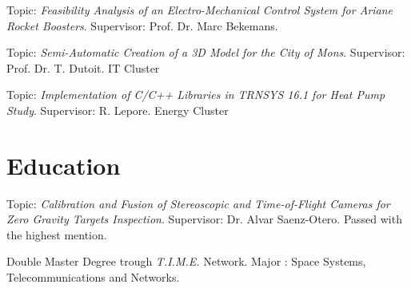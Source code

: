 \documentclass[a4paper]{deedy-resume} %
\begin{document}
Topic: \textit{Feasibility Analysis of an Electro-Mechanical Control System for Ariane Rocket Boosters}. Supervisor: Prof. Dr. Marc Bekemans.

\vspace{10pt}

Topic: \textit{Semi-Automatic Creation of a 3D Model for the City of Mons}. Supervisor: Prof. Dr. T. Dutoit. IT Cluster

\vspace{10pt}

Topic: \textit{Implementation of C/C++ Libraries in TRNSYS 16.1 for Heat Pump Study}. Supervisor: R. Lepore. Energy Cluster

\vspace{15pt}


\section{Education}
\vspace{5pt}

\vspace{2pt}
Topic: \textit{Calibration and Fusion of Stereoscopic and Time-of-Flight Cameras for Zero Gravity Targets Inspection}. Supervisor: Dr. Alvar Saenz-Otero. Passed with the highest mention.

\vspace{10pt}

\vspace{2pt}
Double Master Degree trough \textit{T.I.M.E.} Network. Major : Space Systems, Telecommunications and Networks.
\end{document}
